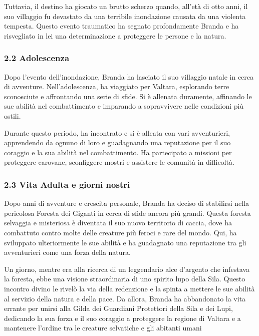 Tuttavia, il destino ha giocato un brutto scherzo quando, all'età di
otto anni, il suo villaggio fu devastato da una terribile inondazione
causata da una violenta tempesta. Questo evento traumatico ha segnato
profondamente Branda e ha risvegliato in lei una determinazione a
proteggere le persone e la natura.

\subsubsection{2.2 Adolescenza}\label{adolescenza}


Dopo l'evento dell'inondazione, Branda ha lasciato il suo villaggio
natale in cerca di avventure. Nell'adolescenza, ha viaggiato per
Valtara, esplorando terre sconosciute e affrontando una serie di sfide.
Si è allenata duramente, affinando le sue abilità nel combattimento e
imparando a sopravvivere nelle condizioni più ostili.

Durante questo periodo, ha incontrato e si è alleata con vari
avventurieri, apprendendo da ognuno di loro e guadagnando una
reputazione per il suo coraggio e la sua abilità nel combattimento. Ha
partecipato a missioni per proteggere carovane, sconfiggere mostri e
assistere le comunità in difficoltà.

\subsubsection{2.3 Vita Adulta e giorni
nostri}\label{vita-adulta-e-giorni-nostri}


Dopo anni di avventure e crescita personale, Branda ha deciso di
stabilirsi nella pericolosa Foresta dei Giganti in cerca di sfide ancora
più grandi. Questa foresta selvaggia e misteriosa è diventata il suo
nuovo territorio di caccia, dove ha combattuto contro molte delle
creature più feroci e rare del mondo. Qui, ha sviluppato ulteriormente
le sue abilità e ha guadagnato una reputazione tra gli avventurieri come
una forza della natura.

Un giorno, mentre era alla ricerca di un leggendario alce d'argento che
infestava la foresta, ebbe una visione straordinaria di uno spirito lupo
della Sila. Questo incontro divino le rivelò la via della redenzione e
la spinta a mettere le sue abilità al servizio della natura e della
pace. Da allora, Branda ha abbandonato la vita errante per unirsi alla
Gilda dei Guardiani Protettori della Sila e dei Lupi, dedicando la sua
forza e il suo coraggio a proteggere la regione di Valtara e a mantenere
l'ordine tra le creature selvatiche e gli abitanti umani

